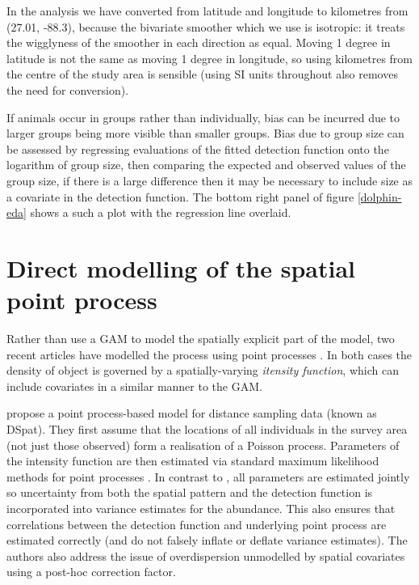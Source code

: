 \documentclass[a4paper,12pt]{article}
\begin{document}
%

In the analysis we have converted from latitude and longitude to kilometres from (27.01, -88.3), because the bivariate smoother which we use \citep[the thin plate spline;][]{Wood:2003tc} is isotropic: it treats the wigglyness of the smoother in each direction as equal. Moving 1 degree in latitude is not the same as moving 1 degree in longitude, so using kilometres from the centre of the study area is sensible (using SI units throughout also removes the need for conversion).

If animals occur in groups rather than individually, bias can be incurred due to larger groups being more visible than smaller groups. Bias due to group size can be assessed by regressing evaluations of the fitted detection function onto the logarithm of group size, then comparing the expected and observed values of the group size, if there is a large difference then it may be necessary to include size as a covariate in the detection function. The bottom right panel of figure \ref{dolphin-eda} shows a such a plot with the regression line overlaid.


\section*{Direct modelling of the spatial point process}
\label{s:direct}

Rather than use a GAM to model the spatially explicit part of the model, two recent articles have modelled the process using point processes \citep{cox1980point}. In both cases the density of object is governed by a spatially-varying \textit{itensity function}, which can include covariates in a similar manner to the GAM.

\cite{Johnson:2010gf} propose a point process-based model for distance sampling data (known as DSpat). They first assume that the locations of all individuals in the survey area (not just those observed) form a realisation of a Poisson process. Parameters of the intensity function are then estimated via standard maximum likelihood methods for point processes \citep{Baddeley:2000to}. In contrast to \cite{Hedley:2004et}, all parameters are estimated jointly so uncertainty from both the spatial pattern and the detection function is incorporated into variance estimates for the abundance. This also ensures that correlations between the detection function and underlying point process are estimated correctly (and do not falsely inflate or deflate variance estimates). The authors also address the issue of overdispersion unmodelled by spatial covariates using a post-hoc correction factor.
\end{document}
